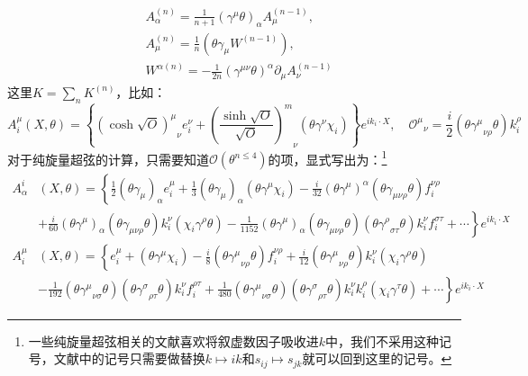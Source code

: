 \begin{equation}
	\begin{aligned}
		&A_\alpha^{(n)} = \frac{1}{n+1} (\gamma^\mu \theta)_\alpha A_\mu^{(n-1)}, \\
		&A_\mu^{(n)} = \frac{1}{n} (\theta \gamma_\mu W^{(n-1)}), \\
		&W^{\alpha(n)} = -\frac{1}{2n} (\gamma^{\mu\nu} \theta)^\alpha \partial_\mu A_\nu^{(n-1)}
	\end{aligned}
\end{equation}
这里$K=\sum_n K^{(n)}$，比如：
\begin{equation}
	A_i^\mu(X,\theta)=\left\{{(\cosh\sqrt{O})^\mu}_\nu e_i^\nu+{\left(\frac{\sinh\sqrt{O}}{\sqrt{O}}\right)^m}_\nu(\theta\gamma^\nu\chi_i)\right\}e^{i k_i\cdot X},\quad {\mathcal{O}^\mu}_\nu=\frac{i}{2}(\theta{\gamma^\mu}_{\nu\rho}\theta)k_i^\rho
\end{equation}
对于纯旋量超弦的计算，只需要知道$\mathcal{O}(\theta^{n\leq 4})$的项，显式写出为：\footnote{一些纯旋量超弦相关的文献喜欢将叙虚数因子吸收进$k$中，我们不采用这种记号，文献中的记号只需要做替换$k\mapsto i k$和$s_{ij}\mapsto s_{jk}$就可以回到这里的记号。}
\begin{equation}
	\label{eq:5.48}
\begin{aligned}
		A_\alpha^i&(X,\theta)=\left\{\frac{1}{2}(\theta\gamma_\mu)_\alpha e_i^\mu+\frac{1}{3}(\theta\gamma_\mu)_\alpha(\theta\gamma^\mu\chi_i)-\frac{i}{32}(\theta\gamma^\mu)^\alpha(\theta\gamma_{\mu\nu\rho}\theta)f_i^{\nu\rho}\right.\\
	&\left.+\frac{i}{60}(\theta\gamma^\mu)_\alpha(\theta\gamma_{\mu\nu\rho}\theta)k_i^\nu(\chi_i\gamma^\rho\theta)-\frac{1}{1152}(\theta\gamma^\mu)_\alpha(\theta\gamma_{\mu\nu\rho}\theta)(\theta{\gamma^\rho}_{\sigma\tau}\theta)k_i^\nu f_i^{\sigma\tau}+\cdots\right\}e^{ik_i\cdot X}
\end{aligned}
\end{equation}
\begin{equation}
	\label{eq:5.49}
	\begin{aligned}
		A_i^\mu&(X,\theta)=\left\{e_i^\mu+(\theta\gamma^\mu\chi_i)-\frac{i}{8}(\theta{\gamma^\mu}_{\nu\rho}\theta)f_i^{\nu\rho}+\frac{i}{12}(\theta{\gamma^\mu}_{\nu\rho}\theta)k_i^\nu(\chi_i\gamma^\rho\theta)\right.\\
		&\left.-\frac{1}{192}(\theta{\gamma^\mu}_{\nu\sigma}\theta)(\theta{\gamma^\sigma}_{\rho\tau}\theta)k_i^\nu f_i^{\rho\tau}+\frac{1}{480}(\theta{\gamma^\mu}_{\nu\sigma}\theta)(\theta{\gamma^\sigma}_{\rho\tau}\theta)k_i^\nu k_i^\rho(\chi_i\gamma^\tau\theta)+\cdots\right\}e^{ik_i\cdot X}
	\end{aligned}
\end{equation}
